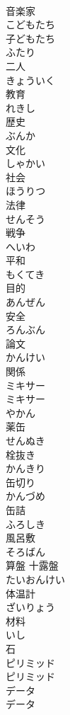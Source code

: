\documentclass[8pt]{extreport}
\begin{document}
\begin{CJK}{UTF8}{min}
\\	音楽家		
\\	こどもたち	
\\	子どもたち		
\\	ふたり	
\\	二人		
\\	きょういく	
\\	教育	
\\	れきし	
\\	歴史		
\\	ぶんか	
\\	文化	
\\	しゃかい	
\\	社会		
\\	ほうりつ	
\\	法律		
\\	せんそう	
\\	戦争		
\\	へいわ	
\\	平和		
\\	もくてき	
\\	目的	
\\	あんぜん	
\\	安全		
\\	ろんぶん	
\\	論文	
\\	かんけい	
\\	関係	
\\	ミキサー	
\\	ミキサー		
\\	やかん	
\\	薬缶		
\\	せんぬき	
\\	栓抜き		
\\	かんきり	
\\	缶切り	
\\	かんづめ	
\\	缶詰	
\\	ふろしき	
\\	風呂敷		
\\	そろばん	
\\	算盤 十露盤		
\\	たいおんけい	
\\	体温計	
\\	ざいりょう	
\\	材料	
\\	いし	
\\	石		
\\	ピリミッド	
\\	ピリミッド		
\\	データ	
\\	データ		

\end{CJK}
\end{document}

